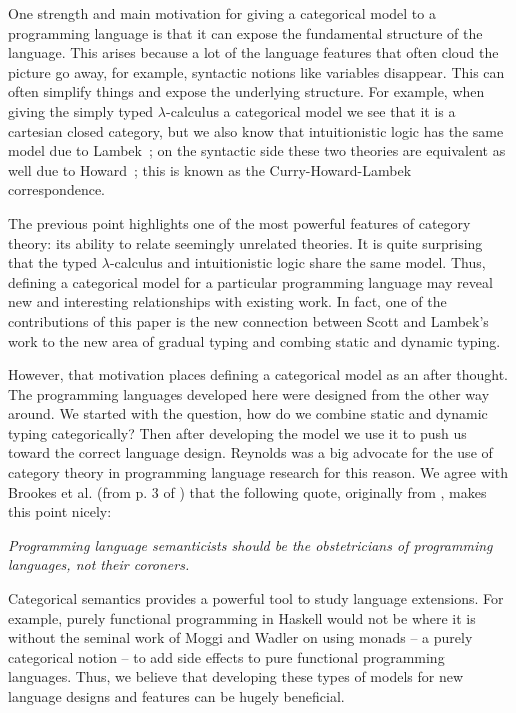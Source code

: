 One strength and main motivation for giving a categorical model to a
programming language is that it can expose the fundamental structure
of the language.  This arises because a lot of the language features
that often cloud the picture go away, for example, syntactic notions
like variables disappear.  This can often simplify things and expose
the underlying structure.  For example, when giving the simply typed
$\lambda$-calculus a categorical model we see that it is a cartesian
closed category, but we also know that intuitionistic logic has the
same model due to Lambek~\cite{Lambek:1980}; on the syntactic side
these two theories are equivalent as well due to
Howard~\cite{Howard:1980}; this is known as the Curry-Howard-Lambek
correspondence.

The previous point highlights one of the most powerful features of
category theory: its ability to relate seemingly unrelated theories.
It is quite surprising that the typed $\lambda$-calculus and
intuitionistic logic share the same model.  Thus, defining a
categorical model for a particular programming language may reveal new
and interesting relationships with existing work.  In fact, one of the
contributions of this paper is the new connection between Scott and
Lambek's work to the new area of gradual typing and combing static and
dynamic typing.

However, that motivation places defining a categorical model as an
after thought.  The programming languages developed here were designed
from the other way around.  We started with the question, how do we
combine static and dynamic typing categorically? Then after developing
the model we use it to push us toward the correct language design.
Reynolds \cite{Brookes:2013} was a big advocate for the use of
category theory in programming language research for this reason.  We
agree with Brookes et al. (from p. 3 of \cite{Brookes:2013}) that the
following quote, originally from
\cite{Reynolds:1995:UFC:199448.199452}, makes this point nicely:
\begin{center}
  \parbox{170pt}{
    \emph{Programming language semanticists should be the obstetricians
    of programming languages, not their coroners.\\
    {}}}
\end{center}

Categorical semantics provides a powerful tool to study language
extensions.  For example, purely functional programming in Haskell
would not be where it is without the seminal work of Moggi and Wadler
\cite{Moggi:1989,Wadler:1995} on using monads -- a purely categorical
notion -- to add side effects to pure functional programming
languages.  Thus, we believe that developing these types of models for
new language designs and features can be hugely beneficial.

